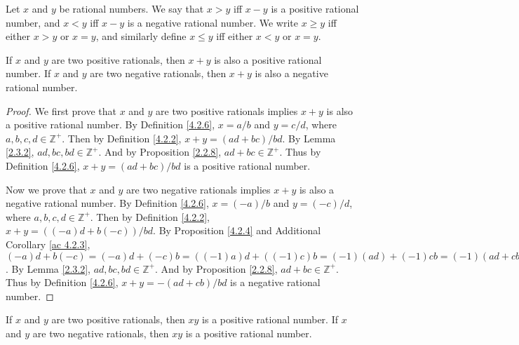 \begin{definition}\label{4.2.8}
Let \(x\) and \(y\) be rational numbers.
We say that \(x > y\) iff \(x - y\) is a positive rational number, and \(x < y\) iff \(x - y\) is a negative rational number.
We write \(x \geq y\) iff either \(x > y\) or \(x = y\), and similarly define \(x \leq y\) iff either \(x < y\) or \(x = y\).
\end{definition}

\begin{additional corollary}\label{ac 4.2.4}
If \(x\) and \(y\) are two positive rationals, then \(x + y\) is also a positive rational number.
If \(x\) and \(y\) are two negative rationals, then \(x + y\) is also a negative rational number.
\end{additional corollary}

\begin{proof}
We first prove that \(x\) and \(y\) are two positive rationals implies \(x + y\) is also a positive rational number.
By Definition \ref{4.2.6}, \(x = a / b\) and \(y = c / d\), where \(a, b, c, d \in \mathds{Z}^+\).
Then by Definition \ref{4.2.2}, \(x + y = (ad + bc) / bd\).
By Lemma \ref{2.3.2}, \(ad, bc, bd \in \mathds{Z}^+\).
And by Proposition \ref{2.2.8}, \(ad + bc \in \mathds{Z}^+\).
Thus by Definition \ref{4.2.6}, \(x + y = (ad + bc) / bd\) is a positive rational number.

Now we prove that \(x\) and \(y\) are two negative rationals implies \(x + y\) is also a negative rational number.
By Definition \ref{4.2.6}, \(x = (-a) / b\) and \(y = (-c) / d\), where \(a, b, c, d \in \mathds{Z}^+\).
Then by Definition \ref{4.2.2}, \(x + y = ((-a)d + b(-c)) / bd\).
By Proposition \ref{4.2.4} and Additional Corollary \ref{ac 4.2.3}, \((-a)d + b(-c) = (-a)d + (-c)b = ((-1)a)d + ((-1)c)b = (-1)(ad) + (-1)cb = (-1)(ad + cb) = -(ad + cb)\).
By Lemma \ref{2.3.2}, \(ad, bc, bd \in \mathds{Z}^+\).
And by Proposition \ref{2.2.8}, \(ad + bc \in \mathds{Z}^+\).
Thus by Definition \ref{4.2.6}, \(x + y = -(ad + cb) / bd\) is a negative rational number.
\end{proof}

\begin{additional corollary}\label{ac 4.2.5}
If \(x\) and \(y\) are two positive rationals, then \(xy\) is a positive rational number.
If \(x\) and \(y\) are two negative rationals, then \(xy\) is a positive rational number.
\end{additional corollary}

